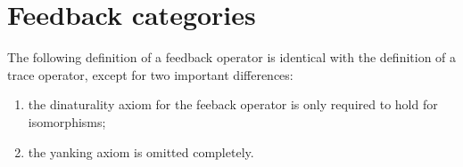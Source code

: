 
\section{Feedback categories}
\label{sec:feedback-categories}

The following definition of a feedback operator is identical with the definition of a trace operator, except for two important differences:
\begin{enumerate}
    \item the dinaturality axiom for the feeback operator is only required to hold for isomorphisms;
    \item the yanking axiom is omitted completely.
\end{enumerate}

